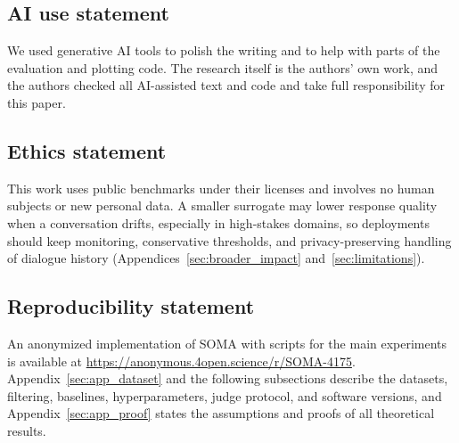 
\subsection*{AI use statement}
We used generative AI tools to polish the writing and to help with parts of the evaluation and plotting code. The research itself is the authors' own work, and the authors checked all AI-assisted text and code and take full responsibility for this paper.

\subsection*{Ethics statement}
This work uses public benchmarks under their licenses and involves no human subjects or new personal data. A smaller surrogate may lower response quality when a conversation drifts, especially in high-stakes domains, so deployments should keep monitoring, conservative thresholds, and privacy-preserving handling of dialogue history (Appendices~\ref{sec:broader_impact} and~\ref{sec:limitations}).

\subsection*{Reproducibility statement}
An anonymized implementation of SOMA with scripts for the main experiments is available at \url{https://anonymous.4open.science/r/SOMA-4175}. Appendix~\ref{sec:app_dataset} and the following subsections describe the datasets, filtering, baselines, hyperparameters, judge protocol, and software versions, and Appendix~\ref{sec:app_proof} states the assumptions and proofs of all theoretical results.
